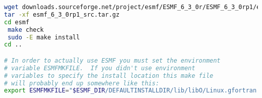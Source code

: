 \documentclass[12pt]{article}
\begin{document}
\begin{lstlisting}[language=bash]
wget downloads.sourceforge.net/project/esmf/ESMF_6_3_0r/ESMF_6_3_0rp1/esmf_6_3_0rp1_src.tar.gz
tar -xf esmf_6_3_0rp1_src.tar.gz
cd esmf 
 make check
 sudo -E make install
cd ..

# In order to actually use ESMF you must set the environment 
# variable ESMFMKFILE.  If you didn't use environment 
# variables to specify the install location this make file 
# will probably end up somewhere like this:
export ESMFMKFILE="$ESMF_DIR/DEFAULTINSTALLDIR/lib/libO/Linux.gfortran.64.openmpi.default/esmf.mk"


\end{lstlisting}
\end{document}
